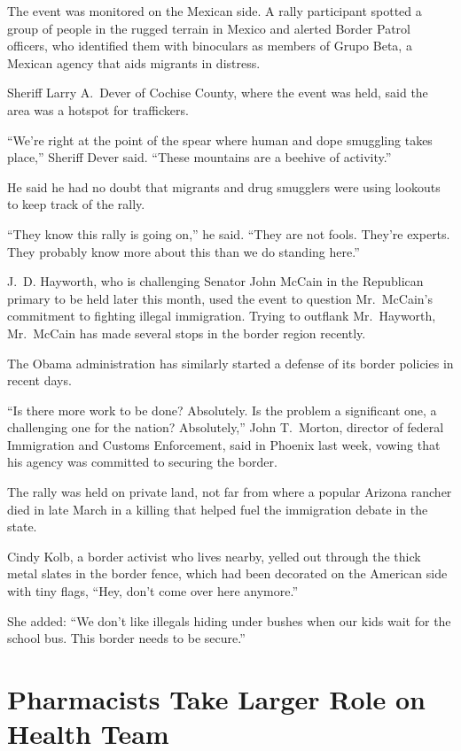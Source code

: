 ﻿\documentclass[12pt]{article}
\begin{document}
The event was monitored on the Mexican side. A rally participant spotted a group of people in the
rugged terrain in Mexico and alerted Border Patrol officers, who identified them with binoculars as
members of Grupo Beta, a Mexican agency that aids migrants in distress.

Sheriff Larry A.~Dever of Cochise County, where the event was held, said the area was a hotspot for
traffickers.

``We're right at the point of the spear where human and dope smuggling takes place,'' Sheriff Dever
said. ``These mountains are a beehive of activity.''

He said he had no doubt that migrants and drug smugglers were using lookouts to keep track of the
rally.

``They know this rally is going on,'' he said. ``They are not fools. They're experts. They probably
know more about this than we do standing here.''

J.~D. Hayworth, who is challenging Senator John McCain in the Republican primary to be held later
this month, used the event to question Mr.~McCain's commitment to fighting illegal immigration.
Trying to outflank Mr.~Hayworth, Mr.~McCain has made several stops in the border region recently.

The Obama administration has similarly started a defense of its border policies in recent days.

``Is there more work to be done? Absolutely. Is the problem a significant one, a challenging one for
the nation? Absolutely,'' John T.~Morton, director of federal Immigration and Customs Enforcement,
said in Phoenix last week, vowing that his agency was committed to securing the border.

The rally was held on private land, not far from where a popular Arizona rancher died in late March
in a killing that helped fuel the immigration debate in the state.

Cindy Kolb, a border activist who lives nearby, yelled out through the thick metal slates in the
border fence, which had been decorated on the American side with tiny flags, ``Hey, don't come over
here anymore.''

She added: ``We don't like illegals hiding under bushes when our kids wait for the school bus. This
border needs to be secure.''

\section{Pharmacists Take Larger Role on Health Team}
\end{document}
